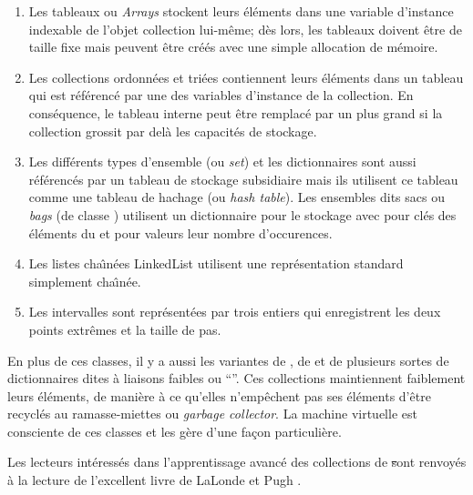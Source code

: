 \documentclass[a4paper,10pt,twoside]{book}
\begin{document}
\begin{enumerate}
  \item Les tableaux ou \emph{Arrays} stockent leurs \'el\'ements dans une
variable d'instance indexable de l'objet collection lui-m\^eme; 
d\`es lors, les tableaux doivent \^etre de taille fixe mais peuvent \^etre
cr\'e\'es avec une simple allocation de m\'emoire.
  \item Les collections ordonn\'ees  et tri\'ees 
 contiennent leurs \'el\'ements dans un tableau
qui est r\'ef\'erenc\'e par une des variables d'instance de la collection.
En cons\'equence, le tableau interne peut \^etre remplac\'e par un 
plus grand si la collection grossit par del\`a les capacit\'es de 
stockage.
  \item Les diff\'erents types d'ensemble (ou \emph{set}) et les dictionnaires
sont aussi r\'ef\'erenc\'es par un tableau de stockage subsidiaire
mais ils utilisent ce tableau comme une tableau de hachage (ou \emph{hash table}). Les ensembles dits sacs ou \emph{bags} (de classe ) utilisent
un dictionnaire  pour le stockage avec pour cl\'es
des \'el\'ements du  et pour valeurs leur nombre d'occurences.
  \item Les listes cha\^{\i}n\'ees LinkedList utilisent une
repr\'esentation standard simplement cha\^{\i}n\'ee.
  \item Les intervalles  sont repr\'esent\'ees 
par trois entiers qui enregistrent les deux points extr\^emes et la taille de pas.
\end{enumerate}
En plus de ces classes, il y a aussi 
les variantes de \mbox{,} de  et de plusieurs sortes de dictionnaires dites \`a liaisons faibles ou ``''. Ces collections
maintiennent faiblement leurs \'el\'ements, \ie
de mani\`ere \`a ce qu'elles n'emp\^echent pas ses \'el\'ements d'\^etre
recycl\'es au ramasse-miettes ou \emph{garbage collector}.
La machine virtuelle \sq est consciente de ces classes et les g\`ere d'une
fa\c{c}on particuli\`ere.

Les lecteurs int\'eress\'es dans l'apprentissage avanc\'e des collections
de \st sont renvoy\'es \`a la lecture de l'excellent livre de LaLonde et Pugh
\cite{LaLo90a}.
\end{document}
